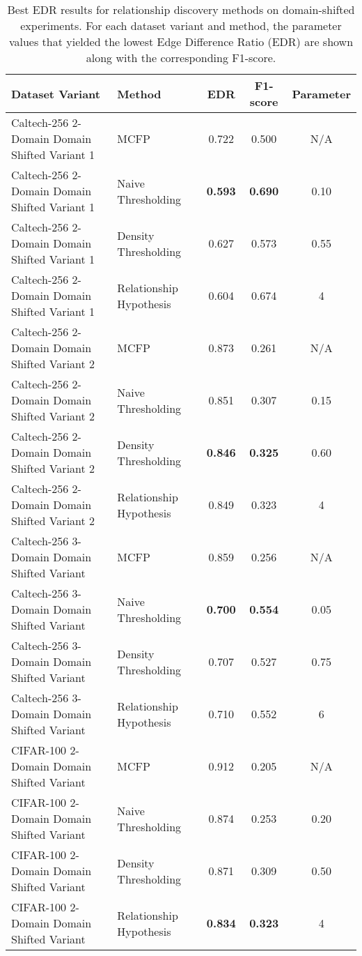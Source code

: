 \begin{table}[ht]
\centering
\caption{Best EDR results for relationship discovery methods on domain-shifted experiments. For each dataset variant and method, the parameter values that yielded the lowest Edge Difference Ratio (EDR) are shown along with the corresponding F1-score.}
\label{tab:relationship_methods_best_edr_domain_shifted}
\begin{tabular}{llccc}
\toprule
Dataset Variant & Method & EDR & F1-score & Parameter \\
\midrule
Caltech-256 2-Domain Domain Shifted Variant 1 & MCFP & 0.722 & 0.500 & N/A \\
Caltech-256 2-Domain Domain Shifted Variant 1 & Naive Thresholding & \textbf{0.593} & \textbf{0.690} & 0.10 \\
Caltech-256 2-Domain Domain Shifted Variant 1 & Density Thresholding & 0.627 & 0.573 & 0.55 \\
Caltech-256 2-Domain Domain Shifted Variant 1 & Relationship Hypothesis & 0.604 & 0.674 & 4 \\
\hline
Caltech-256 2-Domain Domain Shifted Variant 2 & MCFP & 0.873 & 0.261 & N/A \\
Caltech-256 2-Domain Domain Shifted Variant 2 & Naive Thresholding & 0.851 & 0.307 & 0.15 \\
Caltech-256 2-Domain Domain Shifted Variant 2 & Density Thresholding & \textbf{0.846} & \textbf{0.325} & 0.60 \\
Caltech-256 2-Domain Domain Shifted Variant 2 & Relationship Hypothesis & 0.849 & 0.323 & 4 \\
\hline
Caltech-256 3-Domain Domain Shifted Variant & MCFP & 0.859 & 0.256 & N/A \\
Caltech-256 3-Domain Domain Shifted Variant & Naive Thresholding & \textbf{0.700} & \textbf{0.554} & 0.05 \\
Caltech-256 3-Domain Domain Shifted Variant & Density Thresholding & 0.707 & 0.527 & 0.75 \\
Caltech-256 3-Domain Domain Shifted Variant & Relationship Hypothesis & 0.710 & 0.552 & 6 \\
\hline
CIFAR-100 2-Domain Domain Shifted Variant & MCFP & 0.912 & 0.205 & N/A \\
CIFAR-100 2-Domain Domain Shifted Variant & Naive Thresholding & 0.874 & 0.253 & 0.20 \\
CIFAR-100 2-Domain Domain Shifted Variant & Density Thresholding & 0.871 & 0.309 & 0.50 \\
CIFAR-100 2-Domain Domain Shifted Variant & Relationship Hypothesis & \textbf{0.834} & \textbf{0.323} & 4 \\
\bottomrule
\end{tabular}
\end{table}
